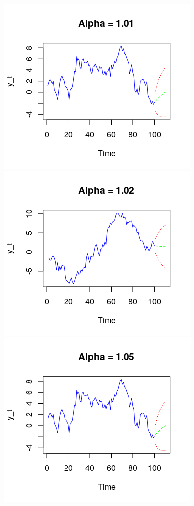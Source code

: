 \documentclass[11pt]{article}
\begin{document}
\begin{center}
\includegraphics[scale=.85]{1b1}
\includegraphics[scale=.85]{1b2}\\
\includegraphics[scale=1]{1b3}\\
\end{center}
\end{document}
